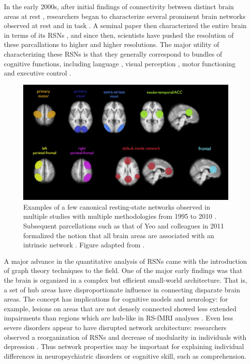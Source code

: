 In the early 2000s, after initial findings of connectivity between distinct brain areas at rest \citep{Biswal1995}, researchers began to characterize several prominent brain networks observed at rest and in task \citep{VandenHeuvel2010}. A seminal paper then characterized the entire brain in terms of its RSNs \citep{Yeo2011}, and since then, scientists have pushed the resolution of these parcallations to higher and higher resolutions. The major utility of characterizing these RSNs is that they generally correspond to bundles of cognitive functions, including language \citep{Cordes2000, Hampson2002}, visual perception \citep{Simmons2012}, motor functioning \citep{Biswal1995} and executive control \citep{Seeley2007}. 

\begin{figure}[t]
    \centering
    \includegraphics[width=5.7in]{images/ch1-ica.png}
    \caption[Examples of canonical resting-state networks]{Examples of a few canonical resting-state networks observed in multiple studies with multiple methodologies from 1995 to 2010 \citep{Biswal1995, Beckmann2005, DeLuca2006,VandenHeuvel2009}. Subsequent parcellations such as that of Yeo and colleagues in 2011 formalized the notion that all brain areas are associated with an intrinsic network \citep{Yeo2011}. Figure adapted from \cite{VandenHeuvel2010}.}
    \label{fig:ch1-ica}
\end{figure}

A major advance in the quantitative analysis of RSNs came with the introduction of graph theory techniques to the field. One of the major early findings was that the brain is organized in a complex but efficient small-world architecture. That is, a set of hub areas have disproportionate influence in connecting disparate brain areas. The concept has implications for cognitive models and neurology: for example, lesions on areas that are not densely connected showed less extended impairments than regions which are hub-like in RS-fMRI analyses \citep{Warren2014}. Even less severe disorders appear to have disrupted network architecture: researchers observed a reorganization of RSNs and decrease of modularity in individuals with depression \citep{Lord2012}. Thus network properties may be important for explaining individual differences in neuropsychiatric disorders or cognitive skill, such as comprehension.


